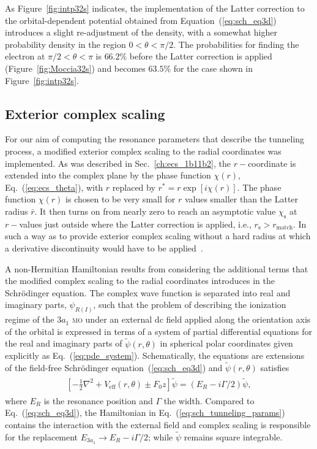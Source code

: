 As Figure~\ref{fig:intp32s} indicates, the implementation of the
Latter correction to the orbital-dependent potential obtained from
Equation~(\ref{eq:sch_eq3d}) introduces a slight re-adjustment of the
density, with a somewhat higher probability density in the region $0 <
\theta < \pi/2$. The probabilities for finding the electron at $\pi/2
< \theta < \pi$ is $66.2\%$ before the Latter correction is applied
(Figure~\ref{fig:Moccia32s}) and becomes $63.5\%$ for the case shown
in Figure~\ref{fig:intp32s}.

\subsection{Exterior complex scaling}
\label{ch:3a1_ecs}

For our aim of computing the resonance parameters that describe the
tunneling process, a modified exterior complex scaling to the radial
coordinates was implemented. As was described in
Sec.~\ref{ch:ecs_1b11b2}, the $r-$coordinate is extended into the
complex plane by the phase function $\chi(r)$,
Eq.~(\ref{eq:ecs_theta}), with $r$ replaced by $r^{*} =
r\exp[i\chi(r)]$. The phase function $\chi(r)$ is chosen to be very
small for $r$ values smaller than the Latter radius $\bar{r}$. It then
turns on from nearly zero to reach an asymptotic value
$\chi_{\mathrm{s}}$ at $r-$values just outside where the Latter
correction is applied, i.e., $r_{\mathrm{s}} > r_{\mathrm{match}}$. In
such a way as to provide exterior complex scaling without a hard
radius at which a derivative discontinuity would have to be
applied~\cite{ecsScrinzi}.

A non-Hermitian Hamiltonian results from considering the additional
terms that the modified complex scaling to the radial coordinates
introduces in the Schr\"{o}dinger equation. The complex wave function
is separated into real and imaginary parts, $\psi_{R(I)}$, such that
the problem of describing the ionization regime of the $3a_{1}$
\textsc{mo} under an external dc field applied along the orientation
axis of the orbital is expressed in terms of a system of partial
differential equations for the real and imaginary parts of
$\widetilde{\psi}(r,\theta)$ in spherical polar coordinates given
explicitly as Eq.~(\ref{eq:pde_system}). Schematically, the equations
are extensions of the field-free Schr\"{o}dinger
equation~(\ref{eq:sch_eq3d}) and $\widetilde{\psi}(r,\theta)$
satisfies~\cite{sarias_2017}
%
\begin{eqnarray}
  \begin{split}
    \left[ -\frac{1}{2}\nabla^{2} + V_{\mathrm{eff}}(r,\theta)
      \pm F_{0}z \right] \widetilde{\psi} = (E_{R} - i\Gamma/2)
    \widetilde{\psi},
  \end{split}
  \label{eq:sch_tunneling_params}
\end{eqnarray}
%
where $E_{R}$ is the resonance position and $\Gamma$ the
width. Compared to Eq.~(\ref{eq:sch_eq3d}), the Hamiltonian in
Eq.~(\ref{eq:sch_tunneling_params}) contains the interaction with the
external field and complex scaling is responsible for the replacement
$E_{3a_{1}} \to E_{R} - i\Gamma/2$; while $\widetilde{\psi}$ remains
square integrable.

